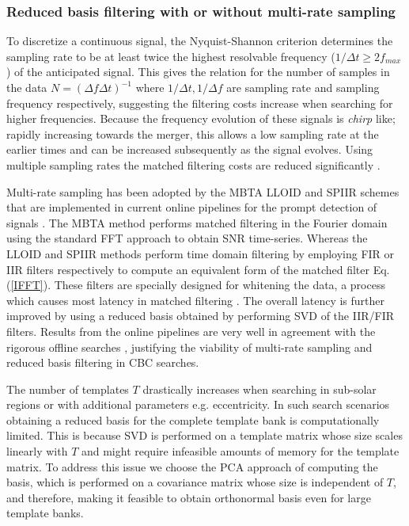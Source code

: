 \subsubsection{Reduced basis filtering with or without multi-rate sampling}
To discretize a continuous signal, the Nyquist-Shannon criterion \cite{Nyquist} determines the sampling rate to be at least twice the highest resolvable frequency ($1/\Delta t \geq 2f_{max}$) of the anticipated signal. This gives the relation for the number of samples in the data $N = (\Delta f \Delta t)^{-1}$ where $1/\Delta t, 1/\Delta f$ are sampling rate and sampling frequency respectively, suggesting the filtering costs increase when searching for higher frequencies. Because the frequency evolution of these signals is \textit{chirp} like; rapidly increasing towards the merger, this allows a low sampling rate at the earlier times and can be increased subsequently as the signal evolves. Using multiple sampling rates the matched filtering costs are reduced significantly \cite{LLOID, mbta_latest, SPIIR_initial}. 

Multi-rate sampling has been adopted by the MBTA \cite{mbta_latest} LLOID \cite{LLOID} and SPIIR \cite{SPIIR_initial} schemes that are implemented in current online pipelines for the prompt detection of signals \cite{SPIIR_GPU, GSTlal_online, mbta_latest}. The MBTA method performs matched filtering in the Fourier domain using the standard FFT approach to obtain SNR time-series. Whereas the LLOID and SPIIR methods perform time domain filtering by employing FIR or IIR filters respectively to compute an equivalent form of the matched filter Eq. (\ref{IFFT}). These filters are specially designed for whitening the data, a process which causes most latency in matched filtering \cite{GSTlal_online, mbta_latest, SPIIR_GPU}. The overall latency is further improved by using a reduced basis obtained by performing SVD of the IIR/FIR filters. Results from the online pipelines are very well in agreement with the rigorous offline searches \cite{pycbc_offline, gstlal_offline}, justifying the viability of multi-rate sampling and reduced basis filtering in CBC searches. 

The number of templates $T$ drastically increases when searching in sub-solar regions \cite{LIGO_subsolar, ET_data_analysis, Nitz_ecc_search, Nitz:2021uxj} or with additional parameters \cite{ianharry_precession, Nitz_ecc_search} e.g. eccentricity. In such search scenarios obtaining a reduced basis for the complete template bank is computationally limited. This is because SVD is performed on a template matrix whose size scales linearly with $T$ and might require infeasible amounts of memory for the template matrix. To address this issue we choose the PCA approach of computing the basis, which is performed on a covariance matrix whose size is independent of $T$, and therefore, making it feasible to obtain orthonormal basis even for large template banks.  

